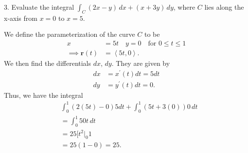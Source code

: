 \documentclass{report}
\begin{document}
    \bigbreak \noindent 
    \begin{mdframed}
        3. Evaluate the integral $\int_C (2x - y) \, dx + (x + 3y) \, dy$, where \(C\) lies along the x-axis from \(x = 0\) to \(x = 5\).
    \end{mdframed}
    \bigbreak \noindent 
    We define the parameterization of the curve $C$ to be
    \begin{align*}
        x &= 5t \quad y = 0 \quad \text{for } 0 \leq t \leq 1 \\
        \implies \mathbf{r}(t) &= \left\langle 5t, 0 \right\rangle
    .\end{align*}
    \bigbreak \noindent 
    We then find the differentials $dx$, $dy$. They are given by 
    \begin{align*}
        dx &= x^{\prime}(t)dt = 5dt\\
        dy &= y^{\prime}(t)dt = 0
    .\end{align*}
    \bigbreak \noindent 
    Thus, we have the integral
    \begin{align*}
        &\int_{0}^{1} (2(5t) - 0 )5dt + \int_{0}^{1} (5t +3(0))0 \, dt \\
        &=\int_{0}^{1} 50t \, dt \\
        &=25\bigg[t^{2}\bigg|_{0}1 \\
        &=25(1-0)  = 25
    .\end{align*}
\end{document}
